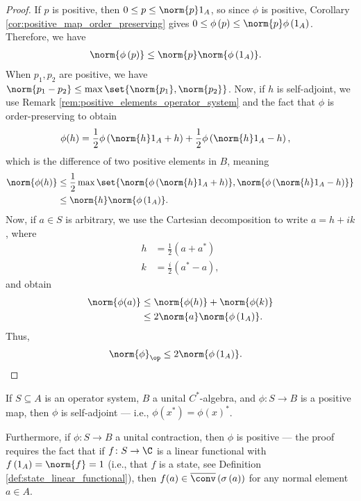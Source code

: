\begin{proof}
  If $p$ is positive, then $0\leq p \leq \norm{p}1_A$, so since $\phi$ is positive, Corollary \ref{cor:positive_map_order_preserving} gives $0\leq \phi\left( p \right)\leq \norm{p}\phi\left( 1_A \right)$. Therefore, we have
  \begin{align*}
    \norm{\phi\left( p \right)} &\leq \norm{p}\norm{\phi\left( 1_A \right)}.
  \end{align*}
  When $p_1,p_2$ are positive, we have $\norm{p_1 - p_2}\leq \max\set{\norm{p_1},\norm{p_2}}$. Now, if $h$ is self-adjoint, we use Remark \ref{rem:positive_elements_operator_system} and the fact that $\phi$ is order-preserving to obtain
  \begin{align*}
    \phi(h) &= \frac{1}{2}\phi\left( \norm{h}1_A + h \right) + \frac{1}{2}\phi\left( \norm{h}1_A - h \right),
  \end{align*}
  which is the difference of two positive elements in $B$, meaning
  \begin{align*}
    \norm{\phi(h)} &\leq \frac{1}{2}\max\set{\norm{\phi\left( \norm{h}1_A + h \right)},\norm{\phi\left( \norm{h}1_A - h \right)}}\\
                   &\leq \norm{h}\norm{\phi\left( 1_A \right)}.
  \end{align*}
  Now, if $a\in S$ is arbitrary, we use the Cartesian decomposition to write $a = h + ik$, where
  \begin{align*}
    h &= \frac{1}{2}\left( a + a^{\ast} \right)\\
    k &= \frac{i}{2}\left( a^{\ast}-a \right),
  \end{align*}
  and obtain
  \begin{align*}
    \norm{\phi(a)} &\leq \norm{\phi(h)} + \norm{\phi(k)}\\
                   &\leq 2\norm{a}\norm{\phi\left( 1_A \right)}.
  \end{align*}
  Thus,
  \begin{align*}
    \norm{\phi}_{\op} &\leq 2\norm{\phi\left( 1_A \right)}.
  \end{align*}
\end{proof}
\begin{remark}
  If $S\subseteq A$ is an operator system, $B$ a unital $C^{\ast}$-algebra, and $\phi\colon S\rightarrow B$ is a positive map, then $\phi$ is self-adjoint --- i.e., $\phi\left( x^{\ast} \right) = \phi\left( x \right)^{\ast}$.\newline

  Furthermore, if $\phi\colon S\rightarrow B$ a unital contraction, then $\phi$ is positive --- the proof requires the fact that if $f\colon S\rightarrow \C$ is a linear functional with $f\left(1_A\right) = \norm{f} = 1$ (i.e., that $f$ is a state, see Definition \ref{def:state_linear_functional}), then $f(a)\in \overline{\conv}\left( \sigma\left( a \right) \right)$ for any normal element $a\in A$.
\end{remark}

